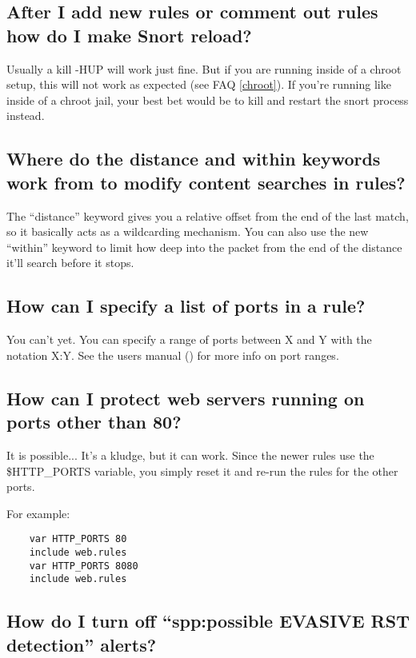 \documentclass{article}
\newcommand{\myref}[1]{(see FAQ \ref{#1})}
\begin{document}
\subsection{After I add new rules or comment out rules how do I make Snort reload?}

Usually a kill -HUP will work just fine. But if you are running inside of a
chroot setup, this will not work as expected \myref{chroot}. If you're running
like inside of a chroot jail, your best bet would be to kill and restart the
snort process instead.

\subsection{Where do the distance and within keywords work from to modify content
searches in rules?}

The ``distance'' keyword gives you a relative offset from the end of the last
match, so it basically acts as a wildcarding mechanism. You can also use the
new ``within'' keyword to limit how deep into the packet from the end of the
distance it'll search before it stops.

\subsection{How can I specify a list of ports in a rule?}

You can't yet. You can specify a range of ports between X and Y with the
notation X:Y. See the users manual () for more info on port ranges.

\subsection{How can I protect web servers running on ports other than 80?}

It is possible... It's a kludge, but it can work. Since the newer rules use
the \$HTTP\_PORTS variable, you simply reset it and re-run the rules for the other
ports.

For example:
\begin{verbatim}
    var HTTP_PORTS 80
    include web.rules
    var HTTP_PORTS 8080
    include web.rules
\end{verbatim}

\subsection{How do I turn off ``spp:possible EVASIVE RST detection'' alerts?}
\end{document}
